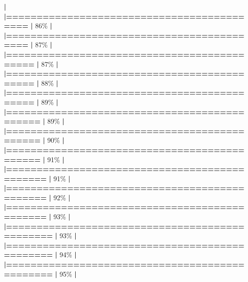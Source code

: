 \documentclass[
]{book}
\newenvironment{Shaded}{\begin{snugshade}}{\end{snugshade}}
\newcommand{\DecValTok}[1]{\textcolor[rgb]{0.00,0.00,0.81}{#1}}
\newcommand{\ErrorTok}[1]{\textcolor[rgb]{0.64,0.00,0.00}{\textbf{#1}}}
\newcommand{\NormalTok}[1]{#1}
\newcommand{\SpecialCharTok}[1]{\textcolor[rgb]{0.81,0.36,0.00}{\textbf{#1}}}
\begin{document}
\begin{Shaded}
\begin{Highlighting}[]
  \SpecialCharTok{|}                                                        
  \ErrorTok{|===========================================}       \ErrorTok{|}  \DecValTok{86}\NormalTok{\%}
  \SpecialCharTok{|}                                                        
  \ErrorTok{|===========================================}       \ErrorTok{|}  \DecValTok{87}\NormalTok{\%}
  \SpecialCharTok{|}                                                        
  \ErrorTok{|============================================}      \ErrorTok{|}  \DecValTok{87}\NormalTok{\%}
  \SpecialCharTok{|}                                                        
  \ErrorTok{|============================================}      \ErrorTok{|}  \DecValTok{88}\NormalTok{\%}
  \SpecialCharTok{|}                                                        
  \ErrorTok{|============================================}      \ErrorTok{|}  \DecValTok{89}\NormalTok{\%}
  \SpecialCharTok{|}                                                        
  \ErrorTok{|=============================================}     \ErrorTok{|}  \DecValTok{89}\NormalTok{\%}
  \SpecialCharTok{|}                                                        
  \ErrorTok{|=============================================}     \ErrorTok{|}  \DecValTok{90}\NormalTok{\%}
  \SpecialCharTok{|}                                                        
  \ErrorTok{|=============================================}     \ErrorTok{|}  \DecValTok{91}\NormalTok{\%}
  \SpecialCharTok{|}                                                        
  \ErrorTok{|==============================================}    \ErrorTok{|}  \DecValTok{91}\NormalTok{\%}
  \SpecialCharTok{|}                                                        
  \ErrorTok{|==============================================}    \ErrorTok{|}  \DecValTok{92}\NormalTok{\%}
  \SpecialCharTok{|}                                                        
  \ErrorTok{|==============================================}    \ErrorTok{|}  \DecValTok{93}\NormalTok{\%}
  \SpecialCharTok{|}                                                        
  \ErrorTok{|===============================================}   \ErrorTok{|}  \DecValTok{93}\NormalTok{\%}
  \SpecialCharTok{|}                                                        
  \ErrorTok{|===============================================}   \ErrorTok{|}  \DecValTok{94}\NormalTok{\%}
  \SpecialCharTok{|}                                                        
  \ErrorTok{|===============================================}   \ErrorTok{|}  \DecValTok{95}\NormalTok{\%}
  \SpecialCharTok{|}                                                        

\end{Highlighting}
\end{Shaded}
\end{document}
